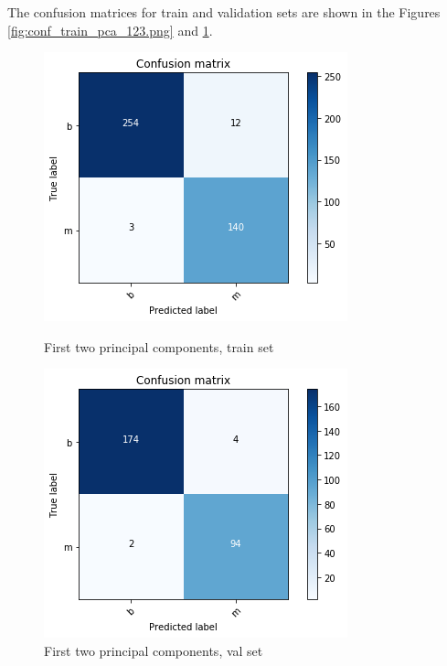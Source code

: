 \documentclass[11pt,a4paper]{article}
\begin{document}
\begin{enumerate}
\begin{enumerate}
		The confusion matrices for train and validation sets are shown in the Figures \ref{fig:conf_train_pca_123.png} and \ref{fig:conf_val_pca_123.png}.
		
		\begin{figure}[H]\centering
			\begin{minipage}{0.49\linewidth}
				\includegraphics[width=\linewidth]{figures/conf_train_pca_123.png}
				\caption{First two principal components, train set}\label{fig:conf_train_pca_123.png}
			\end{minipage}
			\begin{minipage}{0.49\linewidth}
				\includegraphics[width=\linewidth]{figures/conf_val_pca_123.png}
				\caption{First two principal components, val set}\label{fig:conf_val_pca_123.png}
			\end{minipage}
		\end{figure}	
		

\end{enumerate}
\end{enumerate}
\end{document}
